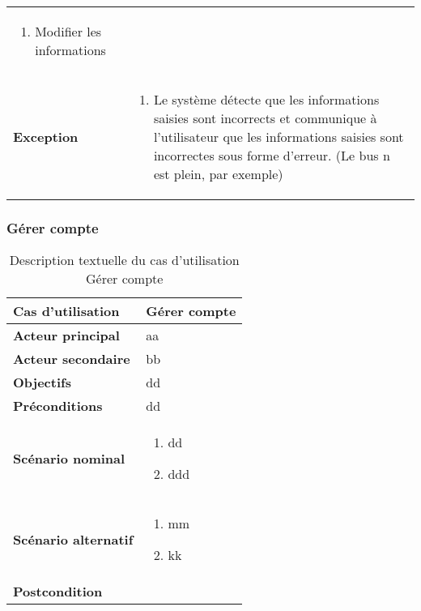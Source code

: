 \begin{longtable}{p{4cm} p{9cm}}
\begin{enumerate}[leftmargin=*]
                        \item Modifier les informations
                    \end{enumerate}
                \\
                \textbf{Exception} &
                    \begin{enumerate}[leftmargin=*]
                        \item Le système détecte que les informations saisies sont incorrects et communique à
                        l’utilisateur que les informations saisies sont incorrectes sous forme d’erreur.
                        (Le bus n est plein, par exemple)
                    \end{enumerate}
            \\\bottomrule
        \end{longtable}

        \subsubsection[Gérer compte]{Gérer compte}
        \begin{longtable}{p{4cm} p{9cm}}
            \caption{Description textuelle du cas d’utilisation Gérer compte}
            \label{table:usecaseGereCompte}
            \\\hline\hline
                \textbf{Cas d’utilisation} & \textbf{Gérer compte}
            \\\hline\hline
                    \textbf{Acteur principal} & aa
                \\
                    \textbf{Acteur secondaire} & bb
                \\
                    \textbf{Objectifs} & dd
                \\
                    \textbf{Préconditions} & dd
                \\
                \textbf{Scénario nominal} &
                    \begin{enumerate}[leftmargin=*]
                        \item dd
                        \item ddd
                    \end{enumerate}
                \\
                \textbf{Scénario alternatif} &
                    \begin{enumerate}[leftmargin=*]
                        \item mm
                        \item kk
                    \end{enumerate}
                \\
                \textbf{Postcondition}
            \\\bottomrule
        \end{longtable}

